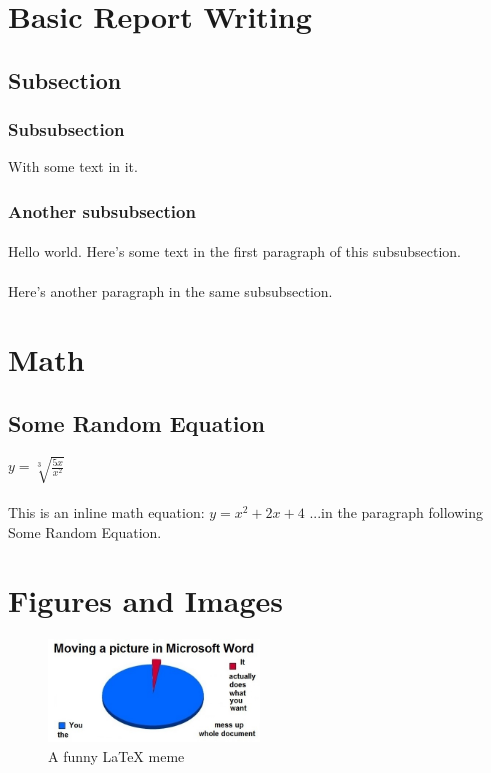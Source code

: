 \documentclass{article}
\begin{document}
\section{Basic Report Writing}
\subsection{Subsection}
\subsubsection{Subsubsection}
With some text in it.
\subsubsection{Another subsubsection}
\paragraph{}
Hello world. Here's some text in the first paragraph of this subsubsection.
\paragraph{}
Here's another paragraph in the same subsubsection. 


\section{Math}
\subsection{Some Random Equation}
$y = \sqrt[3]{\frac{5x}{x^2}}$

\paragraph{}
This is an inline math equation: $y = x^2 + 2x + 4$ ...in the paragraph following Some Random Equation.


\section{Figures and Images}
\begin{figure}[h]
\caption{A funny LaTeX meme}
\centering
\includegraphics[width=0.5\textwidth]{latex-meme.jpg}
\end{figure}
\end{document}

